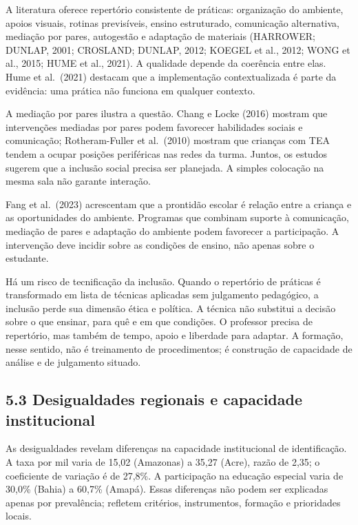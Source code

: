 A literatura oferece repertório consistente de práticas: organização do
ambiente, apoios visuais, rotinas previsíveis, ensino estruturado,
comunicação alternativa, mediação por pares, autogestão e adaptação de
materiais (HARROWER; DUNLAP, 2001; CROSLAND; DUNLAP, 2012; KOEGEL et
al., 2012; WONG et al., 2015; HUME et al., 2021). A qualidade depende da
coerência entre elas. Hume et al.~(2021) destacam que a implementação
contextualizada é parte da evidência: uma prática não funciona em
qualquer contexto.

A mediação por pares ilustra a questão. Chang e Locke (2016) mostram que
intervenções mediadas por pares podem favorecer habilidades sociais e
comunicação; Rotheram-Fuller et al.~(2010) mostram que crianças com TEA
tendem a ocupar posições periféricas nas redes da turma. Juntos, os
estudos sugerem que a inclusão social precisa ser planejada. A simples
colocação na mesma sala não garante interação.

Fang et al.~(2023) acrescentam que a prontidão escolar é relação entre a
criança e as oportunidades do ambiente. Programas que combinam suporte à
comunicação, mediação de pares e adaptação do ambiente podem favorecer a
participação. A intervenção deve incidir sobre as condições de ensino,
não apenas sobre o estudante.

Há um risco de tecnificação da inclusão. Quando o repertório de práticas
é transformado em lista de técnicas aplicadas sem julgamento pedagógico,
a inclusão perde sua dimensão ética e política. A técnica não substitui
a decisão sobre o que ensinar, para quê e em que condições. O professor
precisa de repertório, mas também de tempo, apoio e liberdade para
adaptar. A formação, nesse sentido, não é treinamento de procedimentos;
é construção de capacidade de análise e de julgamento situado.

\subsection{5.3 Desigualdades regionais e capacidade
institucional}\label{desigualdades-regionais-e-capacidade-institucional}

As desigualdades revelam diferenças na capacidade institucional de
identificação. A taxa por mil varia de 15,02 (Amazonas) a 35,27 (Acre),
razão de 2,35; o coeficiente de variação é de 27,8\%. A participação na
educação especial varia de 30,0\% (Bahia) a 60,7\% (Amapá). Essas
diferenças não podem ser explicadas apenas por prevalência; refletem
critérios, instrumentos, formação e prioridades locais.

